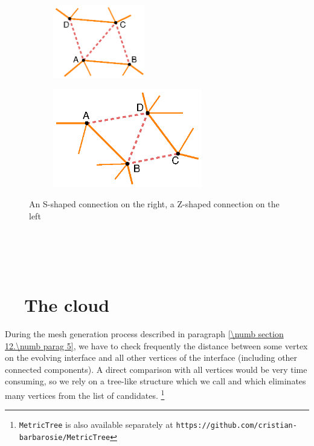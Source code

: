 \begin{figure}[ht] \centering
\begin{subfigure}{45mm}\centering
  \includegraphics[width=40mm]{connect-S}
\end{subfigure}  
\begin{subfigure}{70mm}\centering
  \includegraphics[width=65mm]{connect-Z}
\end{subfigure}  
  \caption{An S-shaped connection on the right, a Z-shaped connection on the left}
  \label{\numb section 12.\numb fig 7}
\end{figure}


\section{~~\cinza{[empty]}}\label{\numb section 12.\numb parag 9}


\section{~~The cloud}\label{\numb section 12.\numb parag 10}

During the mesh generation process described in paragraph \ref{\numb section 12.\numb parag 5},
we have to check frequently the distance between
some vertex on the evolving interface and all other vertices of the interface
(including other connected components).
A direct comparison with all vertices would be very time consuming, so we rely on a tree-like
structure which we call {\small\tt{}} and which eliminates many vertices from the list
of candidates.%
\footnote {{\footnotesize\tt MetricTree} is also available separately at
{\footnotesize\tt https://github.com/cristian-barbarosie/MetricTree}}

